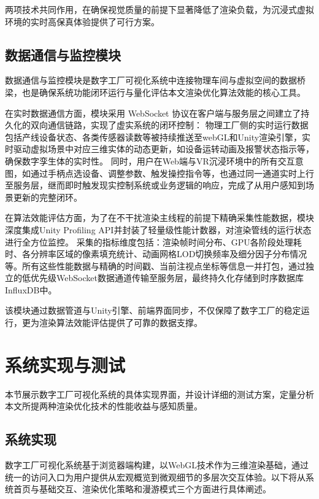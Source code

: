 两项技术共同作用，在确保视觉质量的前提下显著降低了渲染负载，为沉浸式虚拟环境的实时高保真体验提供了可行方案。

\subsection{数据通信与监控模块}
数据通信与监控模块是数字工厂可视化系统中连接物理车间与虚拟空间的数据桥梁，也是确保系统功能闭环运行与量化评估本文渲染优化算法效能的核心工具。

在实时数据通信方面，模块采用 WebSocket 协议在客户端与服务层之间建立了持久化的双向通信链路，实现了虚实系统的闭环控制：
物理工厂侧的实时运行数据包括产线设备状态、各类传感器读数等被持续推送至webGL和Unity渲染引擎，实时驱动虚拟场景中对应三维实体的动态更新，如设备运转动画及报警状态指示等，确保数字孪生体的实时性。
同时，用户在Web端与VR沉浸环境中的所有交互意图，如通过手柄点选设备、调整参数、触发操控指令等，也通过同一通道实时上行至服务层，继而即时触发现实控制系统或业务逻辑的响应，完成了从用户感知到场景更新的完整闭环。

在算法效能评估方面，为了在不干扰渲染主线程的前提下精确采集性能数据，模块深度集成Unity Profiling API并封装了轻量级性能计数器，对渲染管线的运行状态进行全方位监控。
采集的指标维度包括：渲染帧时间分布、GPU各阶段处理耗时、各分辨率区域的像素填充统计、动画网格LOD切换频率及细分因子分布情况等。所有这些性能数据与精确的时间戳、当前注视点坐标等信息一并打包，通过独立的低优先级WebSocket数据通道传输至服务层，最终持久化存储到时序数据库InfluxDB中。

该模块通过数据管道与Unity引擎、前端界面同步，不仅保障了数字工厂的稳定运行，更为渲染算法效能评估提供了可靠的数据支撑。

\section{系统实现与测试}

本节展示数字工厂可视化系统的具体实现界面，并设计详细的测试方案，定量分析本文所提两种渲染优化技术的性能收益与感知质量。

\subsection{系统实现}
数字工厂可视化系统基于浏览器端构建，以WebGL技术作为三维渲染基础，通过统一的访问入口为用户提供从宏观概览到微观细节的多层次交互体验。以下将从系统首页与基础交互、渲染优化策略和漫游模式三个方面进行具体阐述。



